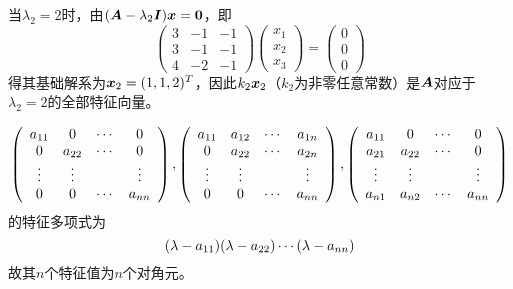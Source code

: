 \begin{frame}
\begin{jie}
    当$\lambda_2=2$时，由$(\boldsymbol{A}-\lambda_2\boldsymbol{I}){\boldsymbol{x}}=\boldsymbol{0}$，即
    $$
    \left(
      \begin{array}{rrr}
        3&-1&-1\\
        3&-1&-1\\
        4&-2&-1
      \end{array}
    \right)
    \left(
      \begin{array}{c}
        x_1\\
        x_2\\
        x_3
      \end{array}
    \right)=
    \left(
      \begin{array}{c}
        0\\
        0\\
        0
      \end{array}
    \right)
    $$
    得其基础解系为${\boldsymbol{x}}_2=(1,1,2)^T$，因此$k_2{\boldsymbol{x}}_2$（$k_2$为非零任意常数）是$\boldsymbol{A}$对应于$\lambda_2=2$的全部特征向量。
  \end{jie}

\end{frame}

\begin{frame}[fragile]\ft{\subsecname}  

  \begin{li}
    $$
    \left(
      \begin{array}{cccc}
        a_{11}&0&\cdots&0\\
        0&a_{22}&\cdots&0\\
        \vdots&\vdots&&\vdots\\
        0&0&\cdots&a_{nn}
      \end{array}
    \right),
    \left(
      \begin{array}{cccc}
        a_{11}&a_{12}&\cdots&a_{1n}\\
        0&a_{22}&\cdots&a_{2n}\\
        \vdots&\vdots&&\vdots\\
        0&0&\cdots&a_{nn}
      \end{array}
    \right),
    \left(
      \begin{array}{cccc}
        a_{11}&0&\cdots&0\\
        a_{21}&a_{22}&\cdots&0\\
        \vdots&\vdots&&\vdots\\
        a_{n1}&a_{n2}&\cdots&a_{nn}
      \end{array}
    \right)
    $$
    的特征多项式为
    $$
    (\lambda-a_{11})(\lambda-a_{22})\cdots(\lambda-a_{nn})
    $$
    故其$n$个特征值为$n$个对角元。
  \end{li}
\end{frame}


